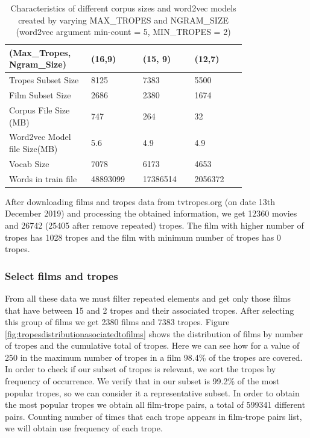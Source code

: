 \documentclass[letterpaper]{article}
\begin{document}
	\begin{table}[t]
		\centering
		\begin{tabular}{|p{0.24\linewidth}|p{0.18\linewidth}|p{0.18\linewidth}|p{0.18\linewidth}|}
			\hline
			\textbf{(Max\_Tropes, Ngram\_Size)}& \textbf{(16,9)} & \textbf{(15, 9)} & \textbf{(12,7)}\\
			\hline
			\hline
			Tropes Subset Size&8125&7383& 5500\\
			\hline
			Film Subset Size&2686&2380& 1674\\
			\hline
			Corpus File Size (MB)&747&264& 32\\
			\hline
			Word2vec Model file Size(MB)&5.6&4.9&4.9\\
			\hline
			Vocab Size& 7078 & 6173 & 4653\\
			\hline
			Words in train file& 48893099 &17386514&2056372\\
			\hline

		\end{tabular}
		\caption{Characteristics of different corpus sizes and word2vec models created by varying MAX\_TROPES and NGRAM\_SIZE (word2vec argument min-count = 5, MIN\_TROPES = 2)} %
		\label{tab:corpusSize}
	\end{table}
	
	After downloading films and tropes data from tvtropes.org (on date 13th December 2019) and processing the obtained information, we get 12360 movies and 26742 (25405 after remove repeated) tropes. The film with higher number of tropes has 1028 tropes and the film with minimum number of tropes has 0 tropes.
	
	\subsubsection{Select films and tropes}
	From all these data we must filter repeated elements and get only those films that have between 15 and 2 tropes and their associated tropes. After selecting this group of films we get 2380 films and 7383 tropes.
	Figure \ref{fig:tropesdistributionasociatedtofilms} shows the distribution of films by number of tropes and the cumulative total of tropes. Here we can see how for a value of 250 in the maximum number of tropes in a film 98.4\% of the tropes are covered. In order to check if our subset of tropes is relevant, we sort the tropes by frequency of occurrence. We verify that in our subset is 99.2\% of the most popular tropes, so we can consider it a representative subset. In order to obtain the most popular tropes we obtain all  film-trope pairs, a total of 599341 different pairs. Counting number of times that each trope appears in film-trope pairs list, we will obtain use frequency of each trope. 
	
\end{document}
